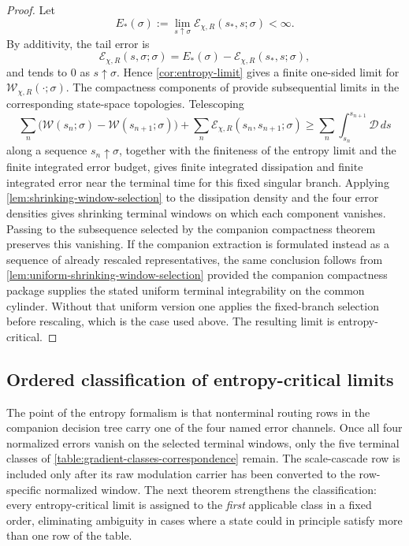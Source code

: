 \documentclass[11pt]{amsart}
\numberwithin{equation}{section}
\theoremstyle{plain}
\theoremstyle{definition}
\theoremstyle{remark}
\newcommand{\Wloc}{\mathcal W}
\newcommand{\Diss}{\mathcal D}
\newcommand{\Err}{\mathcal E}
\begin{document}
\begin{proof}
Let
\[
	E_*(\sigma):=\lim_{s\uparrow\sigma}\Err_{\chi,R}(s_*,s;\sigma)<\infty.
\]
By additivity, the tail error is
\[
	\Err_{\chi,R}(s,\sigma;\sigma)
	=E_*(\sigma)-\Err_{\chi,R}(s_*,s;\sigma),
\]
and tends to \(0\) as \(s\uparrow\sigma\).  Hence
\cref{cor:entropy-limit} gives a finite one-sided limit for
\(\Wloc_{\chi,R}(\cdot;\sigma)\).
The compactness components of
 provide
subsequential limits in the corresponding state-space topologies.  Telescoping
\begin{equation}\label{eq:telescoping}
	\sum_n\bigl(\Wloc(s_n;\sigma)-\Wloc(s_{n+1};\sigma)\bigr)
	+\sum_n\Err_{\chi,R}(s_n,s_{n+1};\sigma)
	\ge \sum_n\int_{s_n}^{s_{n+1}}\Diss\,ds
\end{equation}
along a sequence \(s_n\uparrow\sigma\), together with the finiteness of
the entropy limit and the finite integrated error budget, gives finite
integrated dissipation and finite integrated error near the terminal time for
this fixed singular branch.  Applying
\cref{lem:shrinking-window-selection} to the dissipation density and the
four error densities gives shrinking terminal windows on which each
component vanishes.  Passing to the subsequence selected by the companion
compactness theorem preserves this vanishing.  If the companion extraction is
formulated instead as a sequence of already rescaled representatives, the
same conclusion follows from \cref{lem:uniform-shrinking-window-selection}
provided the companion compactness package supplies the stated uniform
terminal integrability on the common cylinder.  Without that uniform version
one applies the fixed-branch selection before rescaling, which is the case
used above.  The resulting limit is entropy-critical.
\end{proof}

\subsection{Ordered classification of entropy-critical limits}

The point of the entropy formalism is that nonterminal routing rows in the
companion decision tree carry one of the four named error channels.  Once all
four normalized errors vanish on the selected terminal windows, only the five
terminal classes of \cref{table:gradient-classes-correspondence} remain.  The
scale-cascade row is included only after its raw modulation carrier has been
converted to the row-specific normalized window.  The next theorem strengthens
the classification: every entropy-critical limit is assigned to the
\emph{first} applicable class in a fixed order, eliminating ambiguity in cases
where a state could in principle satisfy more than one row of the table.
\end{document}
